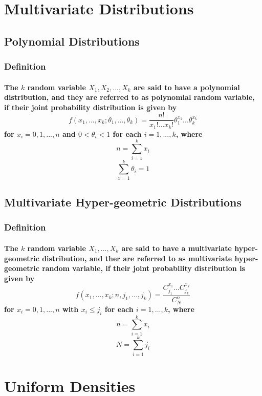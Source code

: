 \documentclass[titlepage]{article}
\begin{document}
    \section{Multivariate Distributions}
        \subsection{Polynomial Distributions}
            \subsubsection*{Definition}
                \paragraph{
                    The $k$ random variable $X_1,X_2,...,X_k$ are said to have a polynomial distribution, and they are referred to as polynomial random variable, if their joint probability distribution is given by
                    $$f(x_1,...,x_k;\theta_1,...,\theta_k)=\frac{n!}{x_1!...x_k!}\theta_1^{x_1}...\theta_k^{x_k}$$
                    for $x_i=0,1,...,n$ and $0<\theta_i<1$ for each $i=1,...,k$, where 
                    $$n=\sum_{i=1}^kx_i$$
                    $$\sum_{x=1}^k\theta_i=1$$
                }
        \subsection{Multivariate Hyper-geometric Distributions}
            \subsubsection*{Definition}
                \paragraph{
                    The $k$ random variable $X_1,...,X_k$ are said to have a multivariate hyper-geometric distribution, and ther are referred to as multivariate hyper-geometric random variable, if their joint probability distribution is given by
                    $$f(x_1,...,x_k;n,j_1,...,j_k)=\frac{C_{j_1}^{x_1}...C_{j_k}^{x_k}}{C_N^n}$$
                    for $x_i=0,1,...,n$ with $x_i\leq j_i$ for each $i=1,...,k$, where 
                    $$n=\sum_{i=1}^kx_i$$
                    $$N=\sum_{i=1}^kj_i$$
                }

    \section{Uniform Densities}
\end{document}
